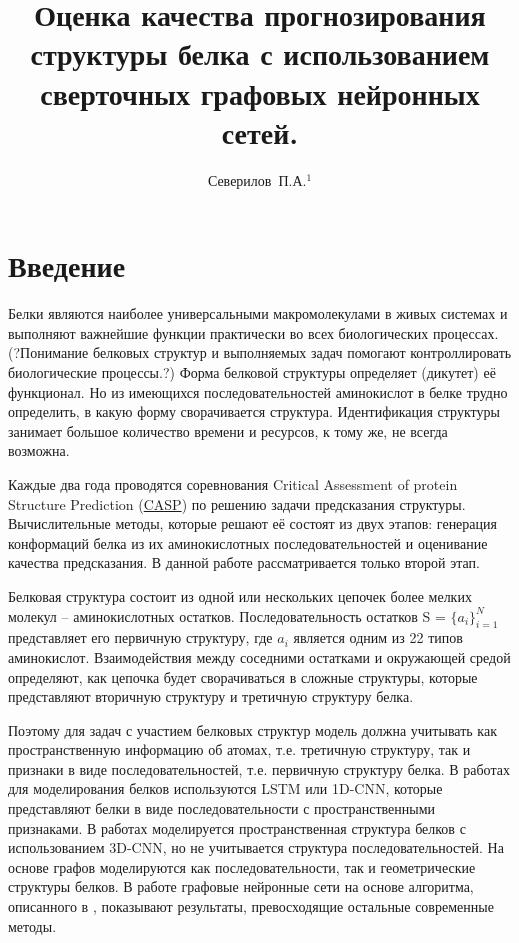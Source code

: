 \documentclass[12pt,twosides]{article}
\title
[Графовые сверточные сети для оценки качества структуры белка]
{Оценка качества прогнозирования структуры белка с использованием сверточных графовых нейронных сетей.}
\author
[Северилов~П.А.] 
{Северилов~П.А.$^1$}
\begin{document}
	\maketitle
	
	\section{Введение}
	
	Белки являются наиболее универсальными макромолекулами в живых системах и выполняют важнейшие функции практически во всех биологических процессах\cite{berg2002biochemistry}. (?Понимание белковых структур и выполняемых задач помогают контроллировать биологические процессы.?)
	Форма белковой структуры определяет (дикутет) её функционал\cite{berg2002biochemistry}. Но из имеющихся последовательностей аминокислот в белке трудно определить, в какую форму сворачивается структура. Идентификация структуры занимает большое количество времени и ресурсов, к тому же, не всегда возможна. 
	
	Каждые два года проводятся соревнования Critical Assessment of protein Structure Prediction (\href{http://predictioncenter.org/}{CASP}) по решению задачи предсказания структуры. 	Вычислительные методы, которые решают её состоят из двух этапов: генерация конформаций белка из их аминокислотных последовательностей и оценивание качества предсказания. В данной работе рассматривается только второй этап.
	
	Белковая структура состоит из одной или нескольких цепочек более мелких молекул -- аминокислотных остатков. Последовательность остатков S = $\{a_i\}_{i=1}^N$ представляет его первичную структуру, где $a_i$ является одним из 22 типов аминокислот. Взаимодействия между соседними остатками и окружающей средой определяют, как цепочка будет сворачиваться в сложные структуры, которые представляют вторичную структуру и третичную структуру белка.
	
	Поэтому для задач с участием белковых структур модель должна учитывать как пространственную информацию об атомах, т.е. третичную структуру, так и признаки в виде последовательностей, т.е. первичную структуру белка.  В работах \cite{HurtadoQA, AngularQA} для моделирования белков используются LSTM или 1D-CNN, которые представляют белки в виде последовательности с пространственными признаками.  В работах \cite{3DCNN, 10.1093/bioinformatics/btz122} моделируется пространственная структура белков с использованием 3D-CNN, но не учитывается структура последовательностей. На основе графов моделируются как последовательности, так и геометрические структуры белков. В работе \cite{Baldassarre2019GraphQAPM} графовые нейронные сети на основе алгоритма, описанного в \cite{Battaglia2018RelationalIB}, показывают результаты, превосходящие остальные современные методы. 
	
\end{document}
